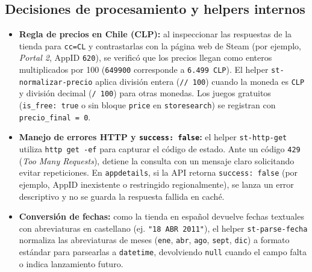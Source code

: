 \documentclass[11pt,a4paper]{article}
\begin{document}
\subsection{Decisiones de procesamiento y helpers internos}
\begin{itemize}
    \item \textbf{Regla de precios en Chile (CLP):} al inspeccionar las respuestas de la tienda para \texttt{cc=CL} y contrastarlas con la página web de Steam (por ejemplo, \emph{Portal 2}, AppID \texttt{620}), se verificó que los precios llegan como enteros multiplicados por 100 (\texttt{649900} corresponde a \texttt{6.499 CLP}). El helper \texttt{st-normalizar-precio} aplica división entera (\texttt{// 100}) cuando la moneda es \texttt{CLP} y división decimal (\texttt{/ 100}) para otras monedas. Los juegos gratuitos (\texttt{is\_free: true} o sin bloque \texttt{price} en \texttt{storesearch}) se registran con \texttt{precio\_final = 0}.
    \item \textbf{Manejo de errores HTTP y \texttt{success: false}:} el helper \texttt{st-http-get} utiliza \texttt{http get -ef} para capturar el código de estado. Ante un código \texttt{429} (\emph{Too Many Requests}), detiene la consulta con un mensaje claro solicitando evitar repeticiones. En \texttt{appdetails}, si la API retorna \texttt{success: false} (por ejemplo, AppID inexistente o restringido regionalmente), se lanza un error descriptivo y no se guarda la respuesta fallida en caché.
    \item \textbf{Conversión de fechas:} como la tienda en español devuelve fechas textuales con abreviaturas en castellano (ej. \texttt{"18 ABR 2011"}), el helper \texttt{st-parse-fecha} normaliza las abreviaturas de meses (\texttt{ene}, \texttt{abr}, \texttt{ago}, \texttt{sept}, \texttt{dic}) a formato estándar para parsearlas a \texttt{datetime}, devolviendo \texttt{null} cuando el campo falta o indica lanzamiento futuro.
\end{itemize}
\end{document}
